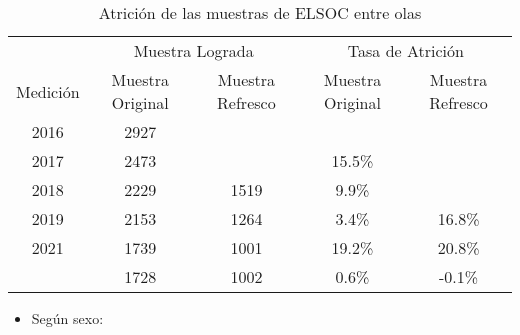 \documentclass[
  12pt,
]{article}
\providecommand{\tightlist}{%
  \setlength{\itemsep}{0pt}\setlength{\parskip}{0pt}}
\begin{document}
\begin{table}[H]

\caption{\label{tab:tabla-atricion}Atrición de las muestras de ELSOC entre olas}
\centering
\begin{tabular}[t]{ccccc}
\toprule
\multicolumn{1}{c}{ } & \multicolumn{2}{c}{Muestra Lograda} & \multicolumn{2}{c}{Tasa de Atrición} \\
\cmidrule(l{3pt}r{3pt}){2-3} \cmidrule(l{3pt}r{3pt}){4-5}
Medición & Muestra Original & Muestra Refresco & Muestra Original & Muestra Refresco\\
\midrule
2016 & 2927 &  &  & \\
2017 & 2473 &  & 15.5\% & \\
2018 & 2229 & 1519 & 9.9\% & \\
2019 & 2153 & 1264 & 3.4\% & 16.8\%\\
2021 & 1739 & 1001 & 19.2\% & 20.8\%\\
\addlinespace
2022 & 1728 & 1002 & 0.6\% & -0.1\%\\
\bottomrule
\end{tabular}
\end{table}

\begin{itemize}
\tightlist
\item
  Según sexo:
\end{itemize}
\end{document}
